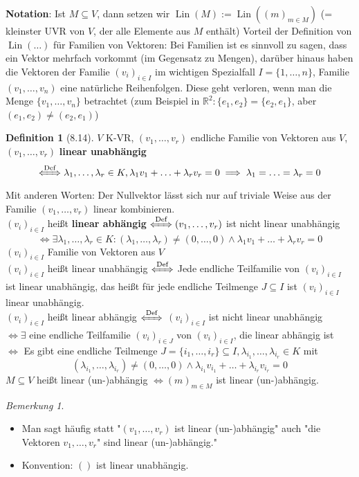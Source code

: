 \documentclass[a4paper]{scrartcl}
\DeclareMathOperator{\Exists}{\exists}
\DeclareMathOperator{\Lin}{Lin}
\theoremstyle{definition}
\newtheorem{defn}{Definition}
\theoremstyle{plain}
\theoremstyle{plain}
\theoremstyle{remark}
\newtheorem{remark}{Bemerkung}
\theoremstyle{remark}
\theoremstyle{remark}
\theoremstyle{remark}
\theoremstyle{remark}
\begin{document}
\textbf{Notation}:
Ist $M\subseteq V$, dann setzen wir $\Lin(M) := \Lin((m)_{m \in M})$ (= kleinster UVR von $V$, der alle Elemente aus $M$ enthält)
Vorteil der Definition von $\Lin(\ldots)$ für Familien von Vektoren: Bei Familien ist es sinnvoll zu sagen, dass ein Vektor mehrfach vorkommt (im Gegensatz zu Mengen), darüber hinaus haben die Vektoren der Familie $(v_i)_{i \in I}$ im wichtigen Spezialfall $I = \{1,\ldots,n\}$,
Familie $(v_1, \ldots, v_n)$ eine natürliche Reihenfolgen. Diese geht verloren, wenn man die Menge $\{v_1, \ldots, v_n\}$ betrachtet (zum Beispiel in $\mathbb{R}^2:\{e_1, e_2\} = \{e_2, e_1\}$, aber $(e_1, e_2) \neq (e_2, e_1)$)
\begin{defn}[8.14]
$V$ K-VR, $(v_1, \ldots, v_r)$ endliche Familie von Vektoren aus $V$, $(v_1, \ldots, v_r)$ \textbf{linear unabhängig}
\[\xLeftrightarrow{\text{Def}} \lambda_1, \ldots, \lambda_r \in K, \lambda_1 v_1 + \ldots + \lambda_r v_r = 0 \implies \lambda_1 = \ldots = \lambda_r = 0\]
Mit anderen Worten: Der Nullvektor lässt sich nur auf triviale Weise aus der Familie $(v_1, \ldots, v_r)$ linear kombinieren. \\
  $(v_i)_{i\in I}$ heißt \textbf{linear abhängig} $\xLeftrightarrow{\text{Def}} (v_1, \ldots, v_r)$ ist nicht linear unabhängig
\[\iff \Exists \lambda_1, \ldots, \lambda_r \in K: (\lambda_1, \ldots, \lambda_r) \neq (0, \ldots, 0) \wedge \lambda_1 v_1 + \ldots + \lambda_r v_r = 0\]
$(v_i)_{i\in I}$ Familie von Vektoren aus $V$ \\
  $(v_i)_{i\in I}$ heißt linear unabhängig $\xLeftrightarrow{\text{Def}}$ Jede endliche Teilfamilie von $(v_i)_{i\in I}$ ist linear unabhängig, das heißt für jede endliche Teilmenge $J\subseteq I$ ist $(v_i)_{i\in I}$ linear unabhängig. \\
  $(v_i)_{i\in I}$ heißt linear abhängig $\xLeftrightarrow{\text{Def}}$ $(v_i)_{i\in I}$ ist nicht linear unabhängig \\
  $\iff \Exists$ eine endliche Teilfamilie $(v_i)_{i\in J}$ von $(v_i)_{i \in I}$, die linear abhängig ist \\
  $\iff$ Es gibt eine endliche Teilmenge $J = \{i_1, \ldots, i_r\} \subseteq I, \lambda_{i_1},\ldots,\lambda_{i_r} \in K$ mit
\[(\lambda_{i_1}, \ldots, \lambda_{i_r}) \neq (0, \ldots, 0) \wedge \lambda_{i_1} v_{i_1} + \ldots + \lambda_{i_r} v_{i_r} = 0\]
$M \subseteq V$ heißt linear (un-)abhängig $\iff (m)_{m\in M}$ ist linear (un-)abhängig.
\end{defn}
\begin{remark}
\begin{itemize}
\item Man sagt häufig statt "$(v_1, \ldots, v_r)$ ist linear (un-)abhängig" auch "die Vektoren $v_1, \ldots, v_r$" sind linear (un-)abhängig."
\item Konvention: $()$ ist linear unabhängig.
\end{itemize}
\end{remark}
\end{document}
